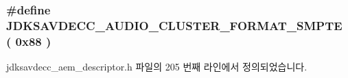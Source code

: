 \subsubsection[{\texorpdfstring{J\+D\+K\+S\+A\+V\+D\+E\+C\+C\+\_\+\+A\+U\+D\+I\+O\+\_\+\+C\+L\+U\+S\+T\+E\+R\+\_\+\+F\+O\+R\+M\+A\+T\+\_\+\+S\+M\+P\+TE}{JDKSAVDECC_AUDIO_CLUSTER_FORMAT_SMPTE}}]{\setlength{\rightskip}{0pt plus 5cm}\#define J\+D\+K\+S\+A\+V\+D\+E\+C\+C\+\_\+\+A\+U\+D\+I\+O\+\_\+\+C\+L\+U\+S\+T\+E\+R\+\_\+\+F\+O\+R\+M\+A\+T\+\_\+\+S\+M\+P\+TE~( 0x88 )}\hypertarget{group__audio__cluster__format_ga4128c05956094f2a231dca8c843154a4}{}\label{group__audio__cluster__format_ga4128c05956094f2a231dca8c843154a4}


jdksavdecc\+\_\+aem\+\_\+descriptor.\+h 파일의 205 번째 라인에서 정의되었습니다.

